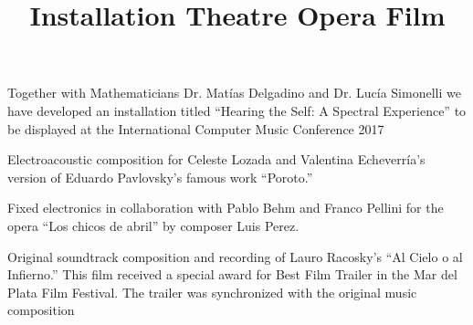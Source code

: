  \title{ Installation}
 \begin{position}
{ Together with Mathematicians Dr. Matías Delgadino and Dr. Lucía Simonelli we have developed an installation titled ``Hearing the Self: A Spectral Experience'' to be displayed at the International Computer Music Conference 2017}
 \end{position}

 
 \title{ Theatre}
 \begin{position}
{ Electroacoustic composition for Celeste Lozada and Valentina Echeverría's version of Eduardo Pavlovsky’s famous work ``Poroto.''}
 \end{position}

 
 \title{ Opera}
 \begin{position}
{ Fixed electronics in collaboration with Pablo Behm and Franco Pellini for the opera ``Los chicos de abril'' by composer Luis Perez.}
 \end{position}

 
 
 \title{ Film}
 \begin{position}
{ Original soundtrack composition and recording of Lauro Racosky's ``Al Cielo o al Infierno.'' This film received a special award for Best Film Trailer in the Mar del Plata Film Festival. The trailer was synchronized with the original music composition}
 \end{position}

 

 
 
